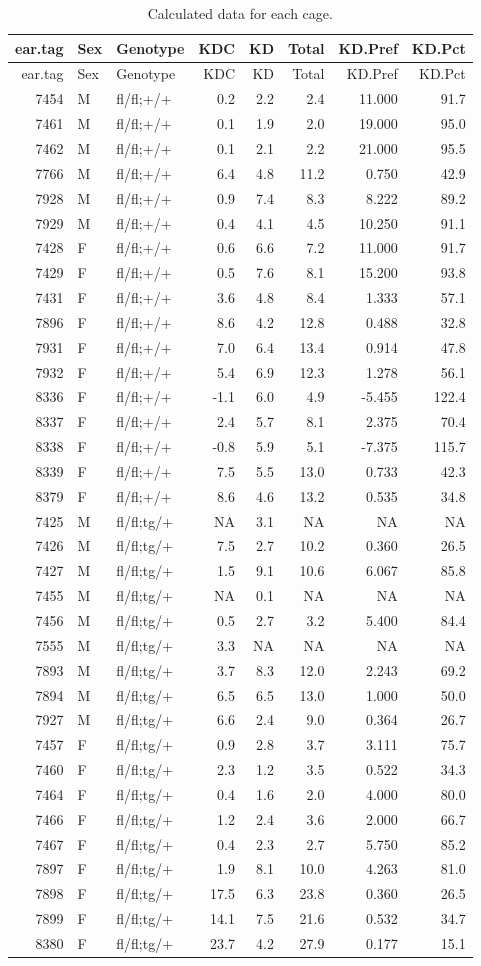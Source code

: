 \documentclass[]{article}
\begin{document}
\begin{longtable}[]{@{}rllrrrrr@{}}
\caption{Calculated data for each cage.}\tabularnewline
\toprule
ear.tag & Sex & Genotype & KDC & KD & Total & KD.Pref &
KD.Pct\tabularnewline
\midrule
\endfirsthead
\toprule
ear.tag & Sex & Genotype & KDC & KD & Total & KD.Pref &
KD.Pct\tabularnewline
\midrule
\endhead
7454 & M & fl/fl;+/+ & 0.2 & 2.2 & 2.4 & 11.000 & 91.7\tabularnewline
7461 & M & fl/fl;+/+ & 0.1 & 1.9 & 2.0 & 19.000 & 95.0\tabularnewline
7462 & M & fl/fl;+/+ & 0.1 & 2.1 & 2.2 & 21.000 & 95.5\tabularnewline
7766 & M & fl/fl;+/+ & 6.4 & 4.8 & 11.2 & 0.750 & 42.9\tabularnewline
7928 & M & fl/fl;+/+ & 0.9 & 7.4 & 8.3 & 8.222 & 89.2\tabularnewline
7929 & M & fl/fl;+/+ & 0.4 & 4.1 & 4.5 & 10.250 & 91.1\tabularnewline
7428 & F & fl/fl;+/+ & 0.6 & 6.6 & 7.2 & 11.000 & 91.7\tabularnewline
7429 & F & fl/fl;+/+ & 0.5 & 7.6 & 8.1 & 15.200 & 93.8\tabularnewline
7431 & F & fl/fl;+/+ & 3.6 & 4.8 & 8.4 & 1.333 & 57.1\tabularnewline
7896 & F & fl/fl;+/+ & 8.6 & 4.2 & 12.8 & 0.488 & 32.8\tabularnewline
7931 & F & fl/fl;+/+ & 7.0 & 6.4 & 13.4 & 0.914 & 47.8\tabularnewline
7932 & F & fl/fl;+/+ & 5.4 & 6.9 & 12.3 & 1.278 & 56.1\tabularnewline
8336 & F & fl/fl;+/+ & -1.1 & 6.0 & 4.9 & -5.455 & 122.4\tabularnewline
8337 & F & fl/fl;+/+ & 2.4 & 5.7 & 8.1 & 2.375 & 70.4\tabularnewline
8338 & F & fl/fl;+/+ & -0.8 & 5.9 & 5.1 & -7.375 & 115.7\tabularnewline
8339 & F & fl/fl;+/+ & 7.5 & 5.5 & 13.0 & 0.733 & 42.3\tabularnewline
8379 & F & fl/fl;+/+ & 8.6 & 4.6 & 13.2 & 0.535 & 34.8\tabularnewline
7425 & M & fl/fl;tg/+ & NA & 3.1 & NA & NA & NA\tabularnewline
7426 & M & fl/fl;tg/+ & 7.5 & 2.7 & 10.2 & 0.360 & 26.5\tabularnewline
7427 & M & fl/fl;tg/+ & 1.5 & 9.1 & 10.6 & 6.067 & 85.8\tabularnewline
7455 & M & fl/fl;tg/+ & NA & 0.1 & NA & NA & NA\tabularnewline
7456 & M & fl/fl;tg/+ & 0.5 & 2.7 & 3.2 & 5.400 & 84.4\tabularnewline
7555 & M & fl/fl;tg/+ & 3.3 & NA & NA & NA & NA\tabularnewline
7893 & M & fl/fl;tg/+ & 3.7 & 8.3 & 12.0 & 2.243 & 69.2\tabularnewline
7894 & M & fl/fl;tg/+ & 6.5 & 6.5 & 13.0 & 1.000 & 50.0\tabularnewline
7927 & M & fl/fl;tg/+ & 6.6 & 2.4 & 9.0 & 0.364 & 26.7\tabularnewline
7457 & F & fl/fl;tg/+ & 0.9 & 2.8 & 3.7 & 3.111 & 75.7\tabularnewline
7460 & F & fl/fl;tg/+ & 2.3 & 1.2 & 3.5 & 0.522 & 34.3\tabularnewline
7464 & F & fl/fl;tg/+ & 0.4 & 1.6 & 2.0 & 4.000 & 80.0\tabularnewline
7466 & F & fl/fl;tg/+ & 1.2 & 2.4 & 3.6 & 2.000 & 66.7\tabularnewline
7467 & F & fl/fl;tg/+ & 0.4 & 2.3 & 2.7 & 5.750 & 85.2\tabularnewline
7897 & F & fl/fl;tg/+ & 1.9 & 8.1 & 10.0 & 4.263 & 81.0\tabularnewline
7898 & F & fl/fl;tg/+ & 17.5 & 6.3 & 23.8 & 0.360 & 26.5\tabularnewline
7899 & F & fl/fl;tg/+ & 14.1 & 7.5 & 21.6 & 0.532 & 34.7\tabularnewline
8380 & F & fl/fl;tg/+ & 23.7 & 4.2 & 27.9 & 0.177 & 15.1\tabularnewline
\bottomrule
\end{longtable}
\end{document}
